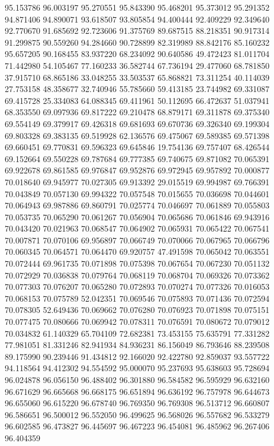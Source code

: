 95.153786
96.003197
95.270551
95.843390
95.468201
95.373012
95.291352
94.871406
94.890071
93.618507
93.805854
94.400444
92.409229
92.349640
92.770670
91.685692
92.723606
91.375769
89.687515
88.218351
90.917314
91.299875
90.559260
94.284660
90.728899
82.319989
88.842176
85.160232
95.657205
90.168455
83.937220
68.234092
90.640586
49.472423
81.011704
71.442980
54.105467
77.160233
36.582744
67.736194
29.477060
68.781850
37.915710
68.865186
33.048255
33.503537
65.868821
73.311254
40.114039
27.753158
48.358677
32.740946
55.785660
59.413185
23.744982
69.331087
69.415728
25.334083
64.088345
69.411961
50.112695
66.472637
51.037941
68.353550
69.097936
69.817222
69.210478
68.879171
69.311878
69.375340
69.554149
69.379917
69.426318
69.681693
69.670736
69.326340
69.199304
69.803328
69.383135
69.519928
62.136576
69.475067
69.589385
69.571398
69.660451
69.770831
69.596323
69.645846
19.754136
69.757407
68.426544
69.152664
69.550228
69.787684
69.777385
69.740675
69.871082
70.065391
69.922678
69.861585
69.976847
69.952876
69.972945
69.957892
70.000877
70.018640
69.945977
70.027305
69.913392
29.015519
69.994987
69.766391
70.043849
70.057130
69.994322
70.057548
70.015655
70.036698
70.044601
70.064943
69.987886
69.860791
70.025774
70.046697
70.061889
70.055803
70.053735
70.065290
70.061267
70.056904
70.065686
70.061846
69.943916
70.043420
70.021963
70.068547
70.064902
70.065931
70.065422
70.067541
70.007871
70.070106
69.956897
70.066749
70.070066
70.067965
70.066796
70.060345
70.064571
70.064470
69.920757
47.491598
70.065042
70.063551
70.072444
69.961735
70.071898
70.075398
70.067654
70.067230
70.051132
70.072929
70.036838
70.079764
70.068119
70.068704
70.069326
70.073362
70.077303
70.076207
70.065280
70.072893
70.070274
70.077326
70.016053
70.068153
70.075789
52.042351
70.069546
70.075893
70.071436
70.072594
70.078305
52.649436
70.069662
70.076280
70.076923
70.071898
70.075151
70.077475
70.080666
70.069942
70.078311
70.076591
70.080672
70.079012
70.034832
61.140329
65.704109
72.682381
73.453155
75.635791
77.331282
77.981051
81.331246
82.941934
84.936231
86.156049
86.793646
88.239508
89.175990
90.239446
91.434812
92.166020
92.422780
92.859037
93.557722
94.118564
94.412302
94.554592
95.000070
95.237693
95.638603
95.728694
96.024878
96.056150
96.488402
96.301880
96.584582
96.595929
96.632160
96.671629
96.665668
96.668175
96.651894
96.636192
96.757978
96.644673
96.655060
96.615220
96.678740
96.769350
96.769308
96.513712
96.660807
96.586651
96.500012
96.552050
96.499625
96.568026
96.557682
96.533279
96.602585
96.473827
96.445697
96.467223
96.454081
96.485962
96.267406
96.404359
